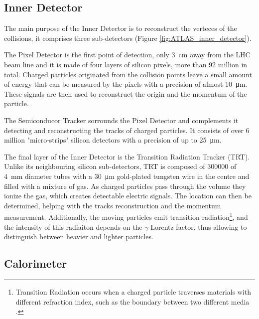 \subsection{Inner Detector}\label{sec:ATLAS_inner_detector}
\marginpar{\flushleft }
The main purpose of the Inner Detector is to reconstruct the verteces of the collisions, it comprises three sub-detectors (Figure \ref{fig:ATLAS_inner_detector}).

The Pixel Detector is the first point of detection, only \qty{3}{\centi\meter} away from the LHC beam line and it is made of four layers of silicon pixels, more than 92 million in total. Charged particles originated from the collision points leave a small amount of energy that can be measured by the pixels with a precision of almost \qty{10}{\micro\meter}. These signals are then used to reconstruct the origin and the momentum of the particle.

The Semiconducor Tracker sorrounds the Pixel Detector and complements it detecting and reconstructing the tracks of charged particles. It consists of over 6 million "micro-strips" silicon detectors with a precision of up to \qty{25}{\micro\meter}.

The final layer of the Inner Detector is the Transition Radiation Tracker (TRT). Unlike its neighbouring silicon sub-detectors, TRT is composed of \num{300000} of \qty{4}{\milli\meter} diameter tubes with a \qty{30}{\micro\meter} gold-plated tungsten wire in the centre and filled with a mixture of gas. As charged particles pass through the volume they ionize the gas, which creates detectable electric signals. The location can then be determined, helping with the tracks reconstruction and the momentum measurement. Additionally, the moving particles emit transition radiation\footnote{Transition Radiation occurs when a charged particle traverses materials with different refraction index, such as the boundary between two different media \cite{wikipediaTransitionRadiation}.}, and the intensity of this radiaiton depends on the $\gamma$ Lorentz factor, thus allowing to distinguish between heavier and lighter particles.


\subsection{Calorimeter}\label{sec:ATLAS_calorimeter}


